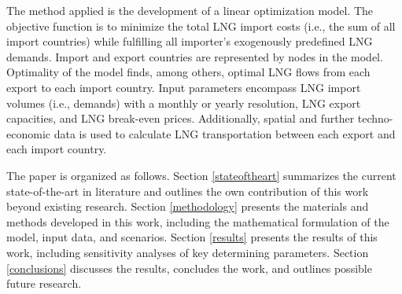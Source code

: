 The method applied is the development of a linear optimization model. The objective function is to minimize the total LNG import costs (i.e., the sum of all import countries) while fulfilling all importer's exogenously predefined LNG demands. Import and export countries are represented by nodes in the model. Optimality of the model finds, among others, optimal LNG flows from each export to each import country. Input parameters encompass LNG import volumes (i.e., demands) with a monthly or yearly resolution, LNG export capacities, and LNG break-even prices. Additionally, spatial and further techno-economic data is used to calculate LNG transportation between each export and each import country.\vspace{0.35cm}   

The paper is organized as follows. Section \ref{stateoftheart} summarizes the current state-of-the-art in literature and outlines the own contribution of this work beyond existing research. Section \ref{methodology} presents the materials and methods developed in this work, including the mathematical formulation of the model, input data, and scenarios. Section \ref{results} presents the results of this work, including sensitivity analyses of key determining parameters. Section \ref{conclusions} discusses the results, concludes the work, and outlines possible future research.
